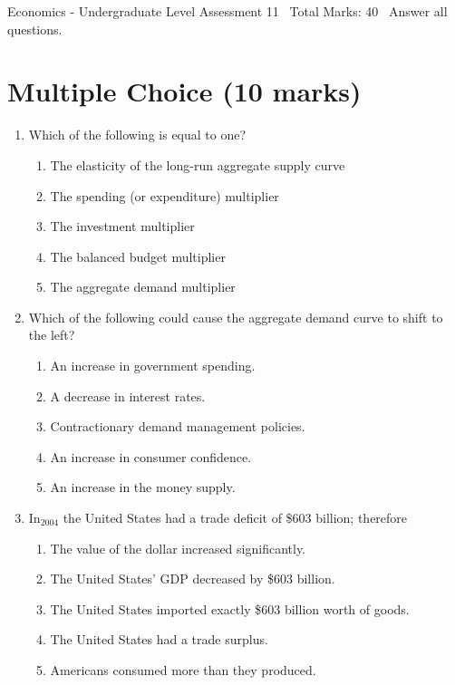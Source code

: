 \documentclass[12pt]{article}
\begin{document}
\begin{center}
Economics - Undergraduate Level Assessment 11 \
Total Marks: 40 \
Answer all questions.
\end{center}

\section*{Multiple Choice (10 marks)}
\begin{enumerate}[label=\arabic*.]
\item Which of the following is equal to one?
\begin{enumerate}[label=(\alph*)]
    \item The elasticity of the long-run aggregate supply curve
    \item The spending (or expenditure) multiplier
    \item The investment multiplier
    \item The balanced budget multiplier
    \item The aggregate demand multiplier
\end{enumerate}
\item Which of the following could cause the aggregate demand curve to shift to the left?
\begin{enumerate}[label=(\alph*)]
    \item An increase in government spending.
    \item A decrease in interest rates.
    \item Contractionary demand management policies.
    \item An increase in consumer confidence.
    \item An increase in the money supply.
\end{enumerate}
\item In$_{2004}$ the United States had a trade deficit of \$603 billion; therefore
\begin{enumerate}[label=(\alph*)]
    \item The value of the dollar increased significantly.
    \item The United States' GDP decreased by \$603 billion.
    \item The United States imported exactly \$603 billion worth of goods.
    \item The United States had a trade surplus.
    \item Americans consumed more than they produced.
\end{enumerate}

\end{enumerate}
\end{document}
